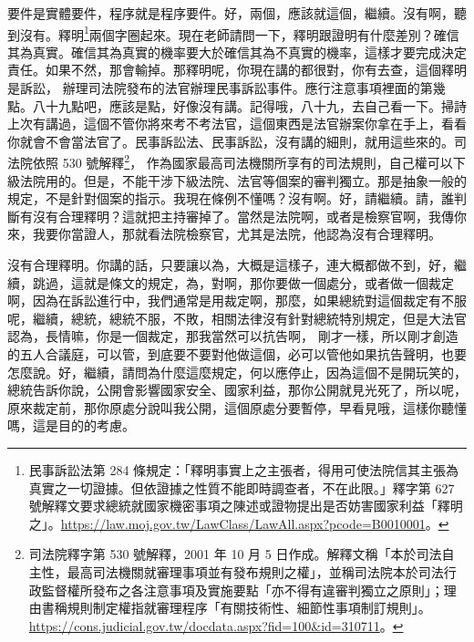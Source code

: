 \hypertarget{c11:cue:215}{}要件是實體要件，程序就是程序要件。好，兩個，應該就這個，繼續。沒有啊，聽到沒有。釋明\footnote{民事訴訟法第 284 條規定：「釋明事實上之主張者，得用可使法院信其主張為真實之一切證據。但依證據之性質不能即時調查者，不在此限。」釋字第 627 號解釋文要求總統就國家機密事項之陳述或證物提出是否妨害國家利益「釋明之」。\url{https://law.moj.gov.tw/LawClass/LawAll.aspx?pcode=B0010001}。}兩個字圈起來。現在老師請問一下，釋明跟證明有什麼差別？確信其為真實。確信其為真實的機率要大於確信其為不真實的機率，這樣才要完成決定責任。如果不然，那會輸掉。那釋明呢，你現在講的都很對，你有去查，這個釋明是訴訟，
\hypertarget{c11:cue:216}{}辦理司法院發布的法官辦理民事訴訟事件。應行注意事項裡面的第幾點。八十九點吧，應該是點，好像沒有講。記得哦，八十九，去自己看一下。掃詩上次有講過，這個不管你將來考不考法官，這個東西是法官辦案你拿在手上，看看你就會不會當法官了。民事訴訟法、民事訴訟，沒有講的細則，就用這些來的。司法院依照 530 號解釋\footnote{司法院釋字第 530 號解釋，2001 年 10 月 5 日作成。解釋文稱「本於司法自主性，最高司法機關就審理事項並有發布規則之權」，並稱司法院本於司法行政監督權所發布之各注意事項及實施要點「亦不得有違審判獨立之原則」；理由書稱規則制定權指就審理程序「有關技術性、細節性事項制訂規則」。\url{https://cons.judicial.gov.tw/docdata.aspx?fid=100&id=310711}。}，
\hypertarget{c11:cue:217}{}作為國家最高司法機關所享有的司法規則，自己權可以下級法院用的。但是，不能干涉下級法院、法官等個案的審判獨立。那是抽象一般的規定，不是針對個案的指示。我現在條例不懂嗎？沒有啊。好，請繼續。請，誰判斷有沒有合理釋明？這就把主持審掉了。當然是法院啊，或者是檢察官啊，我傳你來，我要你當證人，那就看法院檢察官，尤其是法院，他認為沒有合理釋明。

\hypertarget{c11:cue:218}{}沒有合理釋明。你講的話，只要讓以為，大概是這樣子，連大概都做不到，好，繼續，跳過，這就是條文的規定，為，對啊，那你要做一個處分，或者做一個裁定啊，因為在訴訟進行中，我們通常是用裁定啊，那麼，如果總統對這個裁定有不服呢，繼續，總統，總統不服，不敗，相關法律沒有針對總統特別規定，但是大法官認為，長情嘛，你是一個裁定，那我當然可以抗告啊，
\hypertarget{c11:cue:219}{}剛才一樣，所以剛才創造的五人合議庭，可以管，到底要不要對他做這個，必可以管他如果抗告聲明，也要怎麼說。好，繼續，請問為什麼這麼規定，何以應停止，因為這個不是開玩笑的，總統告訴你說，公開會影響國家安全、國家利益，那你公開就見光死了，所以呢，原來裁定前，那你原處分說叫我公開，這個原處分要暫停，早看見哦，這樣你聽懂嗎，這是目的的考慮。

